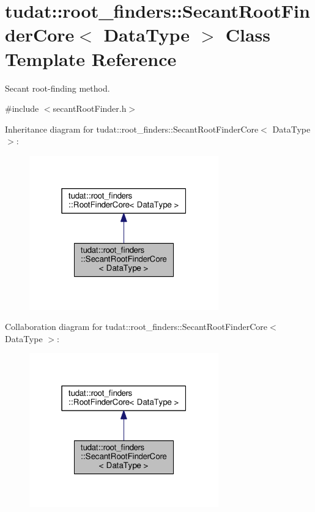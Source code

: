 \hypertarget{classtudat_1_1root__finders_1_1SecantRootFinderCore}{}\section{tudat\+:\+:root\+\_\+finders\+:\+:Secant\+Root\+Finder\+Core$<$ Data\+Type $>$ Class Template Reference}
\label{classtudat_1_1root__finders_1_1SecantRootFinderCore}


Secant root-\/finding method.  




{\ttfamily \#include $<$secant\+Root\+Finder.\+h$>$}



Inheritance diagram for tudat\+:\+:root\+\_\+finders\+:\+:Secant\+Root\+Finder\+Core$<$ Data\+Type $>$\+:
\nopagebreak
\begin{figure}[H]
\begin{center}
\leavevmode
\includegraphics[width=232pt]{classtudat_1_1root__finders_1_1SecantRootFinderCore__inherit__graph}
\end{center}
\end{figure}


Collaboration diagram for tudat\+:\+:root\+\_\+finders\+:\+:Secant\+Root\+Finder\+Core$<$ Data\+Type $>$\+:
\nopagebreak
\begin{figure}[H]
\begin{center}
\leavevmode
\includegraphics[width=232pt]{classtudat_1_1root__finders_1_1SecantRootFinderCore__coll__graph}
\end{center}
\end{figure}
